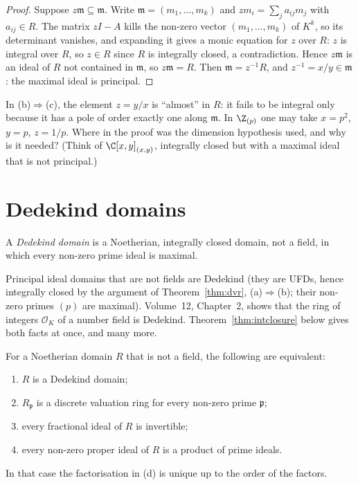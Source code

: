 \begin{proof}
Suppose $z\mathfrak m\subseteq\mathfrak m$. Write $\mathfrak m=(m_1,\dots,m_k)$ and $zm_i=\sum_ja_{ij}m_j$ with $a_{ij}\in R$. The matrix $zI-A$ kills the non-zero vector $(m_1,\dots,m_k)$ of $K^k$, so its determinant
vanishes, and expanding it gives a monic equation for $z$ over $R$: $z$ is integral over $R$, so $z\in R$ since $R$ is integrally closed, a contradiction. Hence $z\mathfrak m$ is an ideal of $R$ not contained in
$\mathfrak m$, so $z\mathfrak m=R$. Then $\mathfrak m=z^{-1}R$, and $z^{-1}=x/y\in\mathfrak m$: the maximal ideal is principal.
\end{proof}

\begin{think}
In (b)$\Rightarrow$(c), the element $z=y/x$ is ``almost'' in $R$: it fails to be integral only because it has a pole of order exactly one along $\mathfrak m$. In $\Z_{(p)}$ one may take $x=p^2$, $y=p$, $z=1/p$. Where in the proof
was the dimension hypothesis used, and why is it needed? (Think of $\C[x,y]_{(x,y)}$, integrally closed but with a maximal ideal that is not principal.)
\end{think}

\section{Dedekind domains}

\begin{definition}\label{def:dedekind}
A \emph{Dedekind domain} is a Noetherian, integrally closed domain, not a field, in which every non-zero prime ideal is maximal.
\end{definition}

Principal ideal domains that are not fields are Dedekind (they are UFDs, hence integrally closed by the argument of Theorem~\ref{thm:dvr}, (a)$\Rightarrow$(b); their non-zero primes $(p)$ are maximal). Volume~12, Chapter~2, shows
that the ring of integers $\mathcal O_K$ of a number field is Dedekind. Theorem~\ref{thm:intclosure} below gives both facts at once, and many more.

\begin{theorem}[Noether, 1927]\label{thm:dedekind}
For a Noetherian domain $R$ that is not a field, the following are equivalent:
\begin{enumerate}[label=(\alph*)]
\item $R$ is a Dedekind domain;
\item $R_{\mathfrak p}$ is a discrete valuation ring for every non-zero prime $\mathfrak p$;
\item every fractional ideal of $R$ is invertible;
\item every non-zero proper ideal of $R$ is a product of prime ideals.
\end{enumerate}
In that case the factorisation in (d) is unique up to the order of the factors.
\end{theorem}

